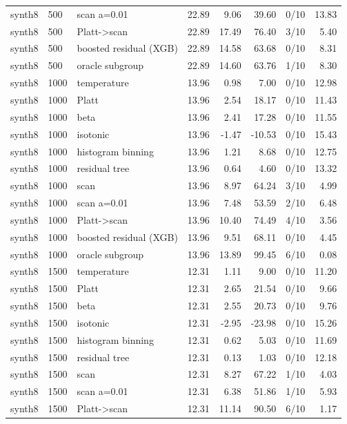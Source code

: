 \begin{tabular}{lllrrrlr}
synth8 & 500 & scan a=0.01 & 22.89 & 9.06 & 39.60 & 0/10 & 13.83 \\
synth8 & 500 & Platt->scan & 22.89 & 17.49 & 76.40 & 3/10 & 5.40 \\
synth8 & 500 & boosted residual (XGB) & 22.89 & 14.58 & 63.68 & 0/10 & 8.31 \\
synth8 & 500 & oracle subgroup & 22.89 & 14.60 & 63.76 & 1/10 & 8.30 \\
synth8 & 1000 & temperature & 13.96 & 0.98 & 7.00 & 0/10 & 12.98 \\
synth8 & 1000 & Platt & 13.96 & 2.54 & 18.17 & 0/10 & 11.43 \\
synth8 & 1000 & beta & 13.96 & 2.41 & 17.28 & 0/10 & 11.55 \\
synth8 & 1000 & isotonic & 13.96 & -1.47 & -10.53 & 0/10 & 15.43 \\
synth8 & 1000 & histogram binning & 13.96 & 1.21 & 8.68 & 0/10 & 12.75 \\
synth8 & 1000 & residual tree & 13.96 & 0.64 & 4.60 & 0/10 & 13.32 \\
synth8 & 1000 & scan & 13.96 & 8.97 & 64.24 & 3/10 & 4.99 \\
synth8 & 1000 & scan a=0.01 & 13.96 & 7.48 & 53.59 & 2/10 & 6.48 \\
synth8 & 1000 & Platt->scan & 13.96 & 10.40 & 74.49 & 4/10 & 3.56 \\
synth8 & 1000 & boosted residual (XGB) & 13.96 & 9.51 & 68.11 & 0/10 & 4.45 \\
synth8 & 1000 & oracle subgroup & 13.96 & 13.89 & 99.45 & 6/10 & 0.08 \\
synth8 & 1500 & temperature & 12.31 & 1.11 & 9.00 & 0/10 & 11.20 \\
synth8 & 1500 & Platt & 12.31 & 2.65 & 21.54 & 0/10 & 9.66 \\
synth8 & 1500 & beta & 12.31 & 2.55 & 20.73 & 0/10 & 9.76 \\
synth8 & 1500 & isotonic & 12.31 & -2.95 & -23.98 & 0/10 & 15.26 \\
synth8 & 1500 & histogram binning & 12.31 & 0.62 & 5.03 & 0/10 & 11.69 \\
synth8 & 1500 & residual tree & 12.31 & 0.13 & 1.03 & 0/10 & 12.18 \\
synth8 & 1500 & scan & 12.31 & 8.27 & 67.22 & 1/10 & 4.03 \\
synth8 & 1500 & scan a=0.01 & 12.31 & 6.38 & 51.86 & 1/10 & 5.93 \\
synth8 & 1500 & Platt->scan & 12.31 & 11.14 & 90.50 & 6/10 & 1.17 \\

\end{tabular}

